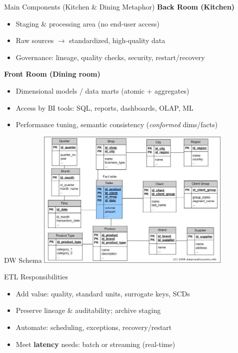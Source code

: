 \documentclass[aspectratio=169]{beamer}
\begin{document}
\begin{frame}{Main Components (Kitchen \& Dining Metaphor)}
    \textbf{Back Room (Kitchen)}
    \begin{itemize}
        \item Staging \& processing area (no end-user access)
        \item Raw sources $\rightarrow$ standardized, high-quality data
        \item Governance: lineage, quality checks, security, restart/recovery
    \end{itemize}
    \textbf{Front Room (Dining room)}
    \begin{itemize}
        \item Dimensional models / data marts (atomic + aggregates)
        \item Access by BI tools: SQL, reports, dashboards, OLAP, ML
        \item Performance tuning, semantic consistency (\emph{conformed} dims/facts)
    \end{itemize}
\end{frame}

\begin{frame}{DW Schema}
    \centering
    \includegraphics[width=0.7\textwidth]{figures/dw_schema}
\end{frame}

\begin{frame}{ETL Responsibilities}
    \begin{itemize}
        \item Add value: quality, standard units, surrogate keys, SCDs
        \item Preserve lineage \& auditability; archive staging
        \item Automate: scheduling, exceptions, recovery/restart
        \item Meet \textbf{latency} needs: batch or streaming (real-time)
    \end{itemize}
\end{frame}
\end{document}
